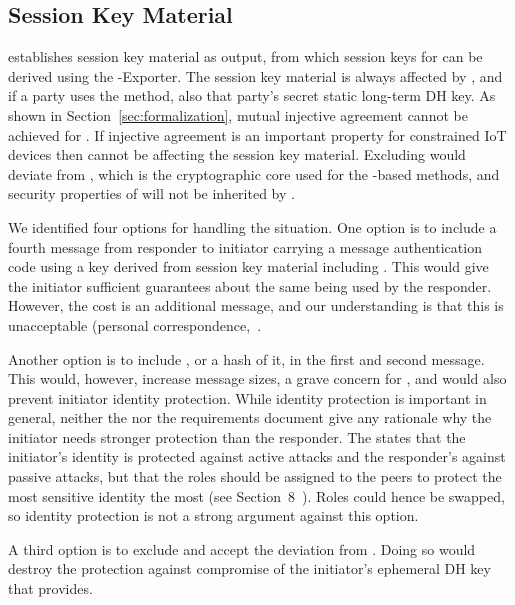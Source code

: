 \documentclass[runningheads, envcountsame, a4paper, draft, x11names]{llncs}
\newcommand{\fillhack}{\vspace{-0.5em}}
\begin{document}
\subsection{Session Key Material}
\label{sec:sessionKeyMaterial}
\fillhack
\mEdhoc{} establishes session key material as output, from which session keys
for \mOscore{} can be derived using the \mEdhoc{}-Exporter.
%
The session key material is always affected by \mGxy{}, and if a party uses the
\mStat{} method, also that party's secret static long-term DH key.
%
As shown in Section~\ref{sec:formalization}, mutual injective agreement cannot
be achieved for \mGiy{}.
%
If injective agreement is an important property for constrained IoT devices then
\mGiy{} cannot be affecting the session key material.
%
Excluding \mGiy{} would deviate from \mOptls{}, which is the cryptographic core
used for the \mStat-based methods, and security properties of \mOptls{} will not
be inherited by \mEdhoc{}.
%

We identified four options for handling the situation.
%
One option is to include a fourth message from responder to initiator
carrying a message authentication code using a key derived from session key
material including \mGiy{}.
%
This would give the initiator sufficient guarantees about the same \mGiy{}
being used by the responder.
%
However, the cost is an additional message, and our understanding is that this
is unacceptable (personal correspondence,~\cite{personalCommunication}.
%

Another option is to include \mGi{}, or a hash of it, in the first and
second message.
%
This would, however, increase message sizes, a grave concern for \mEdhoc{},
and would also prevent initiator identity protection.
%
While identity protection is important in general, neither the \mSpec{} nor
the requirements document give any rationale why the initiator needs stronger
protection than the responder.
%
The \mSpec{} states that the initiator's identity is protected against active
attacks and the responder's against passive attacks, but that the roles should
be assigned to the \mCoap{} peers to protect the most sensitive identity the
most (see Section~8~\cite{selander-lake-edhoc-01}).
%
Roles could hence be swapped, so identity protection is not a strong argument
against this option.
%

A third option is to exclude \mGiy{} and accept the deviation from \mOptls{}.
%
Doing so would destroy the protection against compromise of the
initiator's ephemeral DH key that \mOptls{} provides.
%
\end{document}
